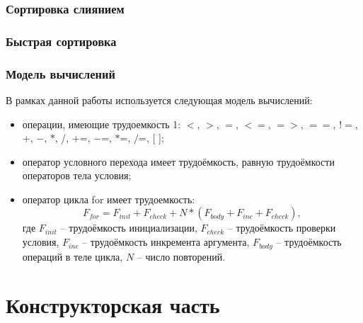 \documentclass[12pt, a4paper]{report}
\begin{document}
	\subsection{Сортировка слиянием}
	
	\subsection{Быстрая сортировка}
	
	\subsection{Модель вычислений}
	В рамках данной работы используется следующая модель вычислений:
	\begin{itemize}
		\item операции, имеющие трудоемкость 1: $<$, $>$, $=$, $<=$, $=>$, $==$, $!=$,$+$, $-$, $\ast$, /, $+$=, $-$=, $\ast$=, $/$=, [ ];
		\item оператор условного перехода имеет трудоёмкость, равную трудоёмкости операторов тела условия;
		\item оператор цикла for имеет трудоемкость:
		\begin{equation}
		\label{for_cost}
		F_{for} = F_{init} + F_{check} + N \ast (F_{body} + F_{inc} + F_{check}),
		\end{equation}
		где $F_{init}$ -- трудоёмкость инициализации, $F_{check}$ -- трудоёмкость проверки условия, $F_{inc}$ -- трудоёмкость инкремента аргумента, $F_{body}$ -- трудоёмкость операций в теле цикла, $N$ -- число повторений. ~\cite{AlgAnalysis}
	\end{itemize} 
	

	\chapter{Конструкторская часть}
	
\end{document}
